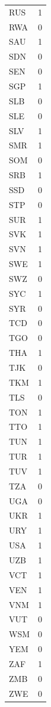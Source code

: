 \begin{tabular}{ll}
RUS & 1 \\
RWA & 0 \\
SAU & 1 \\
SDN & 0 \\
SEN & 0 \\
SGP & 1 \\
SLB & 0 \\
SLE & 0 \\
SLV & 1 \\
SMR & 1 \\
SOM & 0 \\
SRB & 1 \\
SSD & 0 \\
STP & 0 \\
SUR & 1 \\
SVK & 1 \\
SVN & 1 \\
SWE & 1 \\
SWZ & 0 \\
SYC & 1 \\
SYR & 0 \\
TCD & 0 \\
TGO & 0 \\
THA & 1 \\
TJK & 0 \\
TKM & 1 \\
TLS & 0 \\
TON & 1 \\
TTO & 1 \\
TUN & 1 \\
TUR & 1 \\
TUV & 1 \\
TZA & 0 \\
UGA & 0 \\
UKR & 1 \\
URY & 1 \\
USA & 1 \\
UZB & 1 \\
VCT & 1 \\
VEN & 1 \\
VNM & 1 \\
VUT & 0 \\
WSM & 0 \\
YEM & 0 \\
ZAF & 1 \\
ZMB & 0 \\
ZWE & 0 \\
\hline
\end{tabular}
